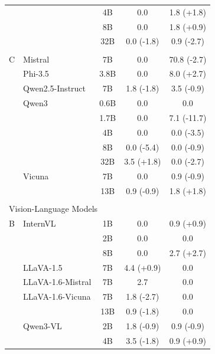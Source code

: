 \begin{table}[t]
{\begin{tabular}{llc|cc}
 &  & 4B & 0.0 & 1.8 \textcolor{[HTML]{0072B2}}{(+1.8)} \\
 &  & 8B & 0.0 & 1.8 \textcolor{[HTML]{0072B2}}{(+0.9)} \\
 &  & 32B & 0.0 \textcolor{[HTML]{CC7A00}}{(-1.8)} & 0.9 \textcolor{[HTML]{CC7A00}}{(-2.7)} \\
\addlinespace[1pt]
\multicolumn{5}{l}{Standalone LLMs} \\
C & Mistral & 7B & 0.0 & 70.8 \textcolor{[HTML]{CC7A00}}{(-2.7)} \\
 & Phi-3.5 & 3.8B & 0.0 & 8.0 \textcolor{[HTML]{0072B2}}{(+2.7)} \\
 & Qwen2.5-Instruct & 7B & 1.8 \textcolor{[HTML]{CC7A00}}{(-1.8)} & 3.5 \textcolor{[HTML]{CC7A00}}{(-0.9)} \\
 & Qwen3 & 0.6B & 0.0 & 0.0 \\
 &  & 1.7B & 0.0 & 7.1 \textcolor{[HTML]{CC7A00}}{(-11.7)} \\
 &  & 4B & 0.0 & 0.0 \textcolor{[HTML]{CC7A00}}{(-3.5)} \\
 &  & 8B & 0.0 \textcolor{[HTML]{CC7A00}}{(-5.4)} & 0.0 \textcolor{[HTML]{CC7A00}}{(-0.9)} \\
 &  & 32B & 3.5 \textcolor{[HTML]{0072B2}}{(+1.8)} & 0.0 \textcolor{[HTML]{CC7A00}}{(-2.7)} \\
 & Vicuna & 7B & 0.0 & 0.9 \textcolor{[HTML]{CC7A00}}{(-0.9)} \\
 &  & 13B & 0.9 \textcolor{[HTML]{CC7A00}}{(-0.9)} & 1.8 \textcolor{[HTML]{0072B2}}{(+1.8)} \\
\addlinespace[1pt]
\midrule
\multicolumn{5}{c}{\textit{Weaker}} \\
\midrule
\multicolumn{5}{l}{Vision-Language Models} \\
B & InternVL & 1B & 0.0 & 0.9 \textcolor{[HTML]{0072B2}}{(+0.9)} \\
 &  & 2B & 0.0 & 0.0 \\
 &  & 8B & 0.0 & 2.7 \textcolor{[HTML]{0072B2}}{(+2.7)} \\
 & LLaVA-1.5 & 7B & 4.4 \textcolor{[HTML]{0072B2}}{(+0.9)} & 0.0 \\
 & LLaVA-1.6-Mistral & 7B & 2.7 & 0.0 \\
 & LLaVA-1.6-Vicuna & 7B & 1.8 \textcolor{[HTML]{CC7A00}}{(-2.7)} & 0.0 \\
 &  & 13B & 0.9 \textcolor{[HTML]{CC7A00}}{(-1.8)} & 0.0 \\
 & Qwen3-VL & 2B & 1.8 \textcolor{[HTML]{CC7A00}}{(-0.9)} & 0.9 \textcolor{[HTML]{CC7A00}}{(-0.9)} \\
 &  & 4B & 3.5 \textcolor{[HTML]{CC7A00}}{(-1.8)} & 0.9 \textcolor{[HTML]{0072B2}}{(+0.9)} \\

\end{tabular}}
\end{table}

